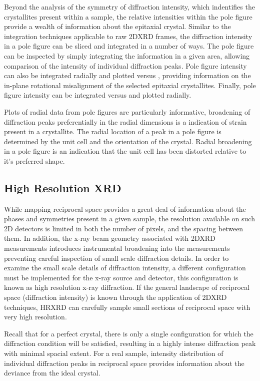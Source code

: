 Beyond the analysis of the symmetry of diffraction intensity, which indentifies the crystallites present within a sample, the relative intensities within the pole figure provide a wealth of information about the epitaxial crystal. Similar to the integration techniques applicable to raw 2DXRD frames, the diffraction intensity in a pole figure can be sliced and integrated in a number of ways. The pole figure can be inspected by simply integrating the information in a given area, allowing comparison of the intensity of individual diffraction peaks. Pole figure intensity can also be integrated radially and plotted versus \textphi{}, providing information on the in-plane rotational misalignment of the selected epitaxial crystallites. Finally, pole figure intensity can be integrated versus \textphi{} and plotted radially.

Plots of radial data from pole figures are particularly informative, broadening of diffraction peaks preferentially in the radial dimensions is a indication of strain present in a crystallite. The radial location of a peak in a pole figure is determined by the unit cell and the orientation of the crystal. Radial broadening in a pole figure is an indication that the unit cell has been distorted relative to it's preferred shape.

\subsection{High Resolution XRD}
While mapping reciprocal space provides a great deal of information about the phases and symmetries present in a given sample, the resolution available on such 2D detectors is limited in both the number of pixels, and the spacing between them. In addition, the x-ray beam geometry associated with 2DXRD measurements introduces instrumental broadening into the measurements preventing careful inspection of small scale diffraction details. In order to examine the small scale details of diffraction intensity, a different configuration must be implemented for the x-ray source and detector, this configuration is known as high resolution x-ray diffraction. If the general landscape of reciprocal space (diffraction intensity) is known through the application of 2DXRD techniques, HRXRD can carefully sample small sections of reciprocal space with very high resolution.

Recall that for a perfect crystal, there is only a single configuration for which the diffraction condition will be satisfied, resulting in a highly intense diffraction peak with minimal spacial extent. For a real sample, intensity distribution of individual diffraction peaks in reciprocal space provides information about the deviance from the ideal crystal.

